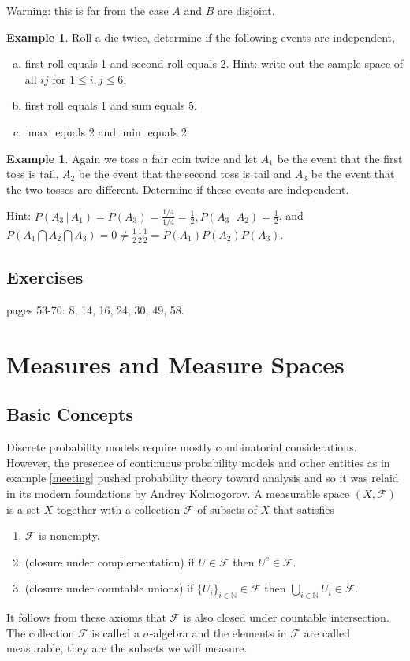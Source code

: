 \documentclass[12pt]{amsart}
\theoremstyle{definition}
\newtheorem{example}[theorem]{Example}
\begin{document}
Warning: this is far from the case $A$ and $B$ are disjoint.

\begin{example} \label{twodierolls} Roll a die twice, determine if the following events are independent,
\begin{enumerate}[a.]
\item first roll equals 1 and second roll equals 2. Hint: write out the sample space of all $ij$ for $1 \leq i, j \leq 6$.
\item first roll equals 1 and sum equals 5.
\item $\max$ equals 2 and $\min$ equals 2.
\end{enumerate}
\end{example}

\begin{example} Again we toss a fair coin twice and let $A_1$ be the event that the first toss is tail, $A_2$ be the event that the second toss is tail and $A_3$ be the event that the two tosses are different. Determine if these events are independent.

Hint: $P(A_3 \,|\, A_1) = P(A_3) = \frac{1/4}{1/4} = \frac{1}{2}, P(A_3 \,|\, A_2) = \frac{1}{2}$, and $P(A_1 \bigcap A_2 \bigcap A_3) = 0 \neq \frac{1}{2}\frac{1}{2}\frac{1}{2} = P(A_1)P(A_2)P(A_3)$.
\end{example}

\subsection{Exercises} pages 53-70: 8, 14, 16, 24, 30, 49, 58.

\section{Measures and Measure Spaces}

\subsection{Basic Concepts} Discrete probability models require mostly combinatorial considerations. However, the presence of continuous probability models and other entities as in example \ref{meeting} pushed probability theory toward analysis and so it was relaid in its modern foundations by Andrey Kolmogorov.
\dfn A measurable space $(X, \mathcal{F})$ is a set $X$ together with a collection $\mathcal{F}$ of subsets of $X$ that satisfies
\begin{enumerate}[1.]
\item $\mathcal{F}$ is nonempty.
\item (closure under complementation) if $U \in \mathcal{F}$ then $U^{c} \in \mathcal{F}$.
\item (closure under countable unions) if $\{U_i\}_{i \in \mathbb{N}} \in \mathcal{F}$ then $\bigcup\limits_{i \in \mathbb{N}} U_i \in \mathcal{F}$.
\end{enumerate}
It follows from these axioms that $\mathcal{F}$ is also closed under countable intersection. The collection $\mathcal{F}$ is called a $\sigma$-algebra and the elements in $\mathcal{F}$ are called measurable, they are the subsets we will measure.
\end{document}
